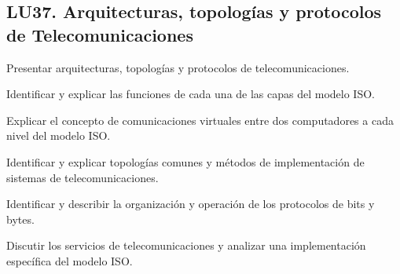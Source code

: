 \subsection{LU37. Arquitecturas, topologías y protocolos de Telecomunicaciones}\label{sec:BOK-LU37}\label{sec:LU37}
\begin{LearningUnit}
\begin{LUGoal}
\item Presentar arquitecturas, topologías y protocolos de telecomunicaciones.
\end{LUGoal}

\begin{LUObjective}
\item Identificar y explicar las funciones de cada una de las capas del modelo ISO.
\item Explicar el concepto de comunicaciones virtuales entre dos computadores a cada nivel del modelo ISO.
\item Identificar y explicar topologías comunes y métodos de implementación de sistemas de telecomunicaciones.
\item Identificar y describir la organización y operación de los protocolos de bits y bytes.
\item Discutir los servicios de telecomunicaciones y analizar una implementación específica del modelo ISO.
\end{LUObjective}
\end{LearningUnit}

